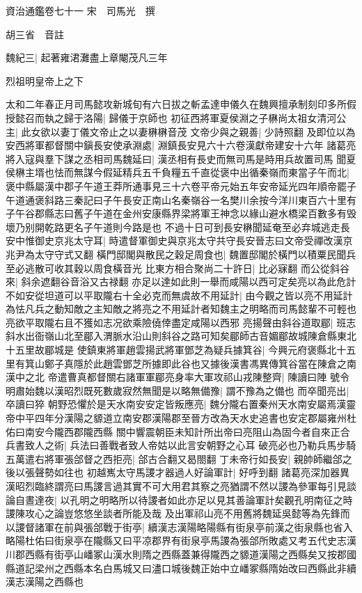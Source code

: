 資治通鑑卷七十一
宋　司馬光　撰

胡三省　音註

魏紀三|{
	起著雍涒灘盡上章閹茂凡三年}


烈祖明皇帝上之下

太和二年春正月司馬懿攻新城旬有六日拔之斬孟達申儀久在魏興擅承制刻印多所假授懿召而執之歸于洛陽|{
	歸儀于京師也}
初征西將軍夏侯淵之子楙尚太祖女清河公主|{
	此女欲以妻丁儀文帝止之以妻楙楙音茂}
文帝少與之親善|{
	少詩照翻}
及即位以為安西將軍都督關中鎭長安使承淵處|{
	淵鎮長安見六十六卷漢獻帝建安十六年}
諸葛亮將入寇與羣下謀之丞相司馬魏延曰|{
	漢丞相有長史而無司馬是時用兵故置司馬}
聞夏侯楙主壻也怯而無謀今假延精兵五千負糧五千直從褒中出循秦嶺而東當子午而北|{
	褒中縣屬漢中郡子午道王莽所通事見三十六卷平帝元始五年安帝延光四年順帝罷子午道通褒斜路三秦記曰子午長安正南山名秦嶺谷一名樊川余按今洋川東百六十里有子午谷郡縣志曰舊子午道在金州安康縣界梁將軍王神念以緣山避水橋梁百數多有毁壞乃别開乾路更名子午道則今路是也}
不過十日可到長安楙聞延奄至必弃城逃走長安中惟御史京兆太守耳|{
	時遣督軍御史與京兆太守共守長安晉志曰文帝受禪改漢京兆尹為太守守式又翻}
橫門邸閣與散民之穀足周食也|{
	魏置邸閣於橫門以積粟民聞兵至必逃散可收其穀以周食橫音光}
比東方相合聚尚二十許日|{
	比必寐翻}
而公從斜谷來|{
	斜余遮翻谷音浴又古禄翻}
亦足以達如此則一舉而咸陽以西可定矣亮以為此危計不如安從坦道可以平取隴右十全必克而無虞故不用延計|{
	由今觀之皆以亮不用延計為怯凡兵之動知敵之主知敵之將亮之不用延計者知魏主之明略而司馬懿輩不可輕也亮欲平取隴右且不獲如志况欲乘險僥倖盡定咸陽以西邪}
亮揚聲由斜谷道取郿|{
	班志斜水出衙嶺山北至郿入渭脈水沿山則斜谷之路可知矣郿師古音媚郿故城陳倉縣東北十五里故郿城是}
使鎮東將軍趙雲揚武將軍鄧芝為疑兵據箕谷|{
	今興元府褒縣北十五里有箕山鄭子真隱於此趙雲鄧芝所據即此谷也又據後漢書馮異傳箕谷當在陳倉之南漢中之北}
帝遣曹真都督關右諸軍軍郿亮身率大軍攻祁山戎陳整齊|{
	陳讀曰陣}
號令明肅始魏以漢昭烈既死數歲寂然無聞是以略無備豫|{
	謂不豫為之備也}
而卒聞亮出|{
	卒讀曰猝}
朝野恐懼於是天水南安安定皆叛應亮|{
	魏分隴右置秦州天水南安屬焉漢靈帝中平四年分漢陽之䝠道立南安郡漢陽郡至晉方改為天水史追書也安定郡屬雍州杜佑曰南安今隴西郡隴西縣}
關中響震朝臣未知計所出帝曰亮阻山為固今者自來正合兵書致人之術|{
	兵法曰善戰者致人帝姑以此言安朝野之心耳}
破亮必也乃勒兵馬步騎五萬遣右將軍張郃督之西拒亮|{
	郃古合翻又曷閤翻}
丁未帝行如長安|{
	親帥師繼郃之後以張聲勢如往也}
初越嶲太守馬謖才器過人好論軍計|{
	好呼到翻}
諸葛亮深加器異漢昭烈臨終謂亮曰馬謖言過其實不可大用君其察之亮猶謂不然以謖為參軍每引見談論自晝達夜|{
	以孔明之明略所以待謖者如此亦足以見其善論軍計矣觀孔明南征之時謖陳攻心之論豈悠悠坐談者所能及哉}
及出軍祁山亮不用舊將魏延吳懿等為先鋒而以謖督諸軍在前與張郃戰于街亭|{
	續漢志漢陽略陽縣有街泉亭前漢之街泉縣也省入略陽杜佑曰街泉亭在隴縣又曰平凉郡界有街泉亭馬謖為張郃所敗處又考五代史志漢川郡西縣有街亭山嶓冢山漢水則隋之西縣蓋兼得隴西之䝠道漢陽之西縣矣又按郡國縣道記梁州之西縣本名白馬城又曰濜口城後魏正始中立嶓冢縣隋始改曰西縣此非續漢志漢陽之西縣也}
